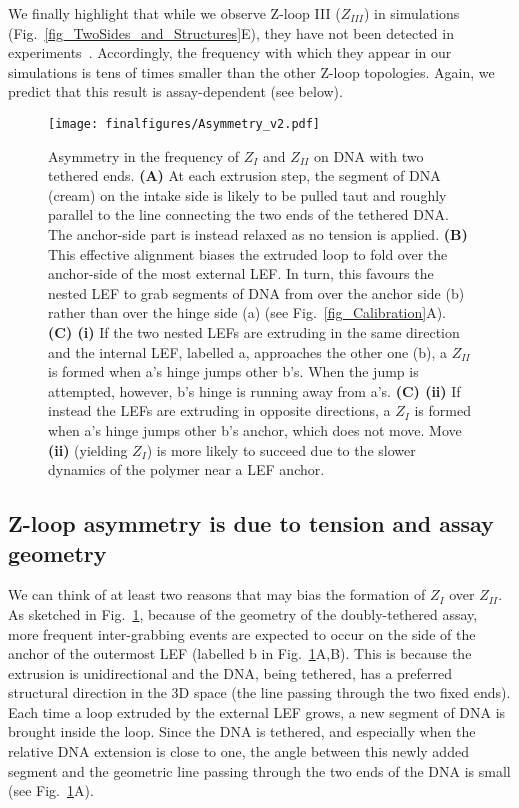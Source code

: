 \documentclass[aps,prl,twocolumn,a4paper,10pt,notitlepage,footinbib,nobalancelastpage,superscriptaddress,showpacs,floatfix]{revtex4-1}%
\begin{document}
We finally highlight that while we observe Z-loop III ($Z_{III}$) in simulations (Fig.~\ref{fig_TwoSides_and_Structures}E), they have not been detected in experiments~\cite{Kim2020}. Accordingly, the frequency with which they appear in our simulations is tens of times smaller than the other Z-loop topologies. Again, we predict that this result is assay-dependent (see below).

\begin{figure}[t!]	
\texttt{[image: finalfigures/Asymmetry\_v2.pdf]}
\caption{Asymmetry in the frequency of $Z_I$ and $Z_{II}$ on DNA with two tethered ends. \textbf{(A)} At each extrusion step, the segment of DNA (cream) on the intake side is likely to be pulled taut and roughly parallel to the line connecting the two ends of the tethered DNA. The anchor-side part is instead relaxed as no tension is applied. \textbf{(B)} This effective alignment biases the extruded loop to fold over the anchor-side of the most external LEF. In turn, this favours the nested LEF to grab segments of DNA from over the anchor side (b) rather than over the hinge side (a)  (see Fig.~\ref{fig_Calibration}A). \textbf{(C) \textbf{(i)}} If the two nested LEFs are extruding in the same direction and the internal LEF, labelled a, approaches the other one (b), a $Z_{II}$ is formed when a's hinge jumps other b's. When the jump is attempted, however, b's hinge is running away from a's. \textbf{(C) (ii)} If instead the LEFs are extruding in opposite directions, a $Z_I$ is formed when a's hinge jumps other b's anchor, which does not move. Move \textbf{(ii)} (yielding $Z_{I}$) is more likely to succeed due to the slower dynamics of the polymer near a LEF anchor.}
\label{fig_Asymmetry}
\end{figure}

\subsection{Z-loop asymmetry is due to tension and assay geometry}

We can think of at least two reasons that may bias the formation of $Z_I$ over $Z_{II}$. As sketched in Fig.~\ref{fig_Asymmetry}, because of the geometry of the doubly-tethered assay, more frequent inter-grabbing events are expected to occur on the side of the anchor of the outermost LEF (labelled b in Fig.~\ref{fig_Asymmetry}A,B). This is because the extrusion is unidirectional and the DNA, being tethered, has a preferred structural direction in the 3D space (the line passing through the two fixed ends). Each time a loop extruded by the external LEF grows, a new segment of DNA is brought inside the loop. Since the DNA is tethered, and especially when the relative DNA extension is close to one, the angle between this newly added segment and the geometric line passing through the two ends of the DNA is small (see Fig.~\ref{fig_Asymmetry}A).
\end{document}
